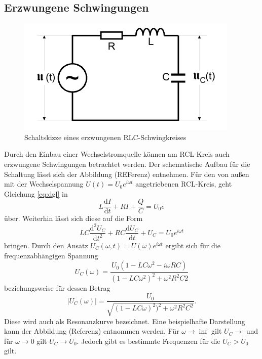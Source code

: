 \subsection{Erzwungene Schwingungen}


\begin{figure}[H]
  \centering
  \includegraphics{content/ErzwungenerSchwingkreis.png}
  \caption{Schaltskizze eines erzwungenen RLC-Schwingkreises}
  \label{fig:esk}
\end{figure}



Durch den Einbau einer Wechselstromquelle können am RCL-Kreis auch erzwungene Schwingungen 
betrachtet werden. Der schematische Aufbau für die Schaltung lässt sich der Abbildung (REFerenz) 
entnehmen. Für den von außen mit der Wechselspannung $U(t) = U_0 e^{i\omega t}$ angetriebenen 
RCL-Kreis, geht Gleichung \ref{eq:dgl} in 
\begin{equation}
    L \frac{\mathrm{d}I}{\mathrm{d}t} + RI + \frac{Q}{C} = U_0 e^{}
\end{equation}
\noindent über. Weiterhin lässt sich diese auf die Form
\begin{equation}
    LC \frac{\mathrm{d}^{2}U_C}{\mathrm{d}t^{2}} + RC \frac{\mathrm{d}U_C}{\mathrm{d}t} + U_C = U_0 e^{i\omega t}
\end{equation}
\noindent bringen. Durch den Ansatz $U_C(\omega,t) = U(\omega) e^{i\omega t}$ ergibt sich 
für die frequenzabhängigen Spannung 
\begin{equation}
    U_C(\omega) = \frac{U_0(1-LC\omega^{2}-i\omega RC)}{(1-LC \omega^{2})^{2} + \omega^{2}R^{2}C{2} }
\end{equation}
beziehungsweise für dessen Betrag
\begin{equation}
    |U_C(\omega)| = \frac{U_0}{\sqrt{(1-LC\omega)^{2})^{2}+\omega^{2}R^{2}C^{2}}}.
\end{equation}
Diese wird auch als Resonanzkurve bezeichnet. Eine beispielhafte Darstellung kann der Abbildung 
(Referenz) entnommen werden. Für $\omega \rightarrow \inf$ gilt $U_C \rightarrow$ 
und für $\omega \rightarrow 0$ gilt $U_C \rightarrow U_0$. Jedoch gibt es bestimmte Frequenzen
für die $U_C > U_0$ gilt. 



\cite{sample}
